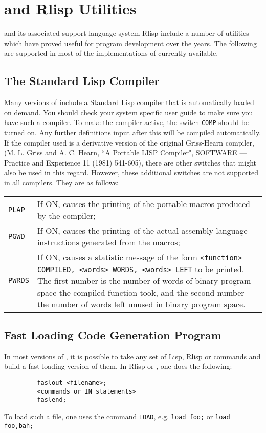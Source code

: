 \chapter{{\REDUCE} and Rlisp Utilities}

{\REDUCE} and its associated support language system Rlisp
include a number of utilities which have proved useful for program
development over the years.  The following are supported in most of the
implementations of {\REDUCE} currently available.

\section{The Standard Lisp Compiler}

Many versions of {\REDUCE} include a Standard Lisp compiler that is
automatically loaded on demand.  You should check your system specific
user guide to make sure you have such a compiler.  To make the compiler
active, the switch {\tt COMP} should be turned on.  Any
further definitions input after this will be compiled automatically.  If
the compiler used is a derivative version of the original Griss-Hearn
compiler,
(M. L. Griss and A.
C. Hearn, ``A Portable LISP Compiler", SOFTWARE --- Practice and Experience
11 (1981) 541-605),
there are other switches that might also be
used in this regard.  However, these additional switches are not supported
in all compilers.  They are as follows:

{\renewcommand{\arraystretch}{2}
\begin{tabular}{lp{\reduceboxwidth}}
{\tt PLAP} & If ON, causes the printing of the
portable macros produced by the compiler; \\
%
{\tt PGWD} & If ON, causes the printing of the
actual assembly language instructions generated from the macros; \\
%
{\tt PWRDS} & If ON, causes a statistic
message of the form \newline
{\tt    <function> COMPILED, <words> WORDS, <words> LEFT} \newline
to be printed.  The first number is the number of words of binary
program space the compiled function took, and the second number
the number of words left unused in binary program space. \\
\end{tabular}}

\section{Fast Loading Code Generation Program}
\label{sec-load}
In most versions of {\REDUCE}, it is possible to take any set of Lisp, Rlisp
or {\REDUCE} commands and build a fast loading version of them. In Rlisp or
{\REDUCE}, one does the following:
\begin{verbatim}
         faslout <filename>;
         <commands or IN statements>
         faslend;
\end{verbatim}
To load such a file, one uses the command {\tt LOAD},
e.g. {\tt load foo;}
or {\tt load foo,bah;}

